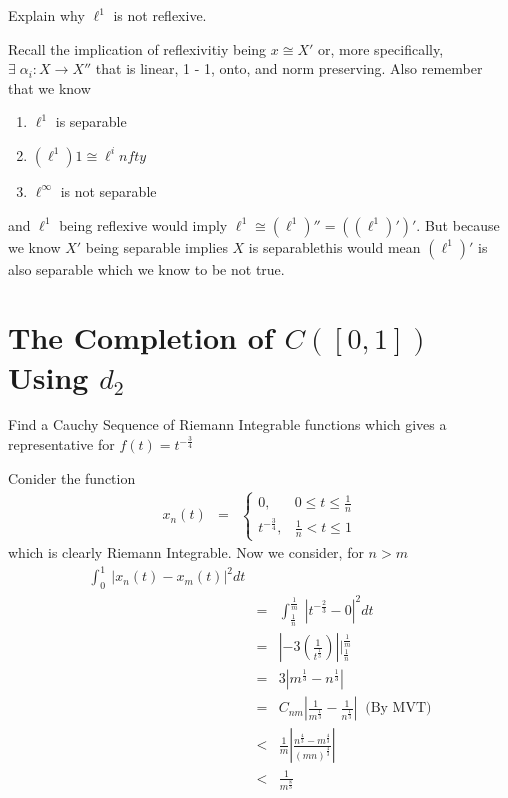 \documentclass[11pt]{SelfArxOneColBMN}
\begin{document}
\begin{exercise}
Explain why $\ell^1$ is not reflexive.
\end{exercise}

\begin{solution}
Recall the implication of reflexivitiy being $x \cong X'$ or, more specifically, $\exists \; \alpha_i: X \rightarrow X''$ that is linear, 1 - 1, onto, and norm preserving. Also remember that we know
\begin{enumerate}
  \item $\ell^1$ is separable
  \item $(\ell^1)1 \cong \ell^infty$
  \item $\ell^\infty$ is not separable
\end{enumerate}
and $\ell^1$ being reflexive would imply $\ell^1 \cong (\ell^1)'' = ((\ell^1)')'$. But because we know $X'$ being separable implies $X$ is separablethis would mean $(\ell^1)'$ is also separable which we know to be not true. 
\end{solution}

\section{The Completion of $C([0,1])$ Using $d_2$}

\begin{exercise}
Find a Cauchy Sequence of Riemann Integrable functions which gives a representative for $f(t) = t^{-\frac{3}{4}}$
\end{exercise}

\begin{solution}
Conider the function 
\begin{eqnarray*}
x_n(t) &=&
\left \{
\begin{array}{ll}
0, & 0 \leq t \leq \frac{1}{n}\\
t^{-\frac{3}{4}}, & \frac{1}{n} < t \leq 1
\end{array}
\right .
\end{eqnarray*}
which is clearly Riemann Integrable. Now we consider, for $n > m$
\begin{eqnarray*}
  \int_0^1\:|x_n(t) - x_m(t)|^2dt\\
  &=& \int_\frac{1}{n}^\frac{1}{m}\:|t^{-\frac{2}{3}} - 0|^2dt\\
  &=& |-3(\frac{1}{t^\frac{1}{3}})||_\frac{1}{n}^\frac{1}{m}\\
  &=& 3|m^\frac{1}{3} - n^\frac{1}{3}|\\
  &=& C_{nm}|\frac{1}{m^\frac{1}{3}} - \frac{1}{n^\frac{1}{3}}| \;\; \text{(By MVT)}\\
  &<& \frac{1}{m}|\frac{n^\frac{4}{3} - m^\frac{4}{3}}{(mn)^\frac{4}{3}}|\\
  &<& \frac{1}{m^\frac{8}{3}}
\end{eqnarray*}
\end{solution}
\end{document}
